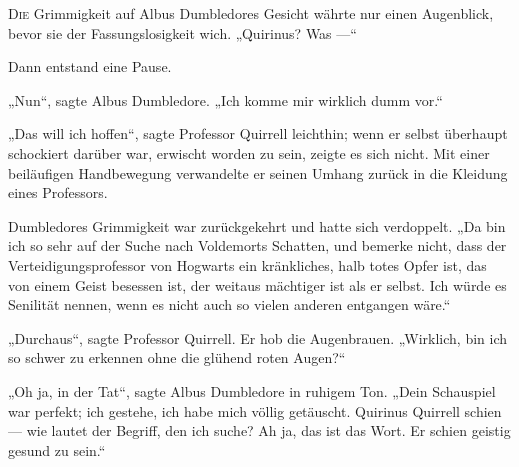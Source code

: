 
\lettrine{D}{ie} Grimmigkeit auf Albus Dumbledores Gesicht währte nur einen Augenblick, bevor sie der Fassungslosigkeit wich.
„Quirinus? Was —“

Dann entstand eine Pause.

„Nun“, sagte Albus Dumbledore.
„Ich komme mir wirklich dumm vor.“

„Das will ich hoffen“, sagte Professor Quirrell leichthin; wenn er selbst überhaupt schockiert darüber war, erwischt worden zu sein, zeigte es sich nicht. Mit einer beiläufigen Handbewegung verwandelte er seinen Umhang zurück in die Kleidung eines Professors.

Dumbledores Grimmigkeit war zurückgekehrt und hatte sich verdoppelt.
„Da bin ich so sehr auf der Suche nach Voldemorts Schatten, und bemerke nicht, dass der Verteidigungsprofessor von Hogwarts ein kränkliches, halb totes Opfer ist, das von einem Geist besessen ist, der weitaus mächtiger ist als er selbst. Ich würde es Senilität nennen, wenn es nicht auch so vielen anderen entgangen wäre.“

„Durchaus“, sagte Professor Quirrell. Er hob die Augenbrauen.
„Wirklich, bin ich so schwer zu erkennen ohne die glühend roten Augen?“

„Oh ja, in der Tat“, sagte Albus Dumbledore in ruhigem Ton.
„Dein Schauspiel war perfekt; ich gestehe, ich habe mich völlig getäuscht. Quirinus Quirrell schien — wie lautet der Begriff, den ich suche? Ah ja, das ist das Wort. Er schien geistig gesund zu sein.“

